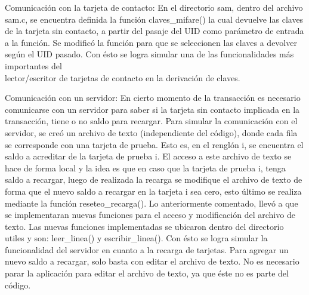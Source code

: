 \bigskip
{}

\bigskip
Comunicación con la tarjeta de contacto: En el directorio sam, dentro del archivo sam.c, se encuentra definida la función claves\_mifare() la cual devuelve las claves de la tarjeta sin contacto, a partir del pasaje del UID como parámetro de entrada a la función. Se modificó la función para que se seleccionen las claves a devolver según el UID pasado. Con ésto se logra simular una de las funcionalidades más importantes del \\
lector/escritor de tarjetas de contacto en la derivación de claves.

\bigskip
Comunicación con un servidor: En cierto momento de la transacción es necesario comunicarse con un servidor para saber si la tarjeta sin contacto implicada en la transacción, tiene o no saldo para recargar. Para simular la comunicación con el servidor, se creó un archivo de texto (independiente del código), donde cada fila se corresponde con una tarjeta de prueba. Esto es, en el renglón i, se encuentra el saldo a acreditar de la tarjeta de prueba i. El acceso a este archivo de texto se hace de forma local y la idea es que en caso que la tarjeta de prueba i, tenga saldo a recargar, luego de realizada la recarga se modifique el archivo de texto de forma que el nuevo saldo a recargar en la tarjeta i sea cero, esto último se realiza mediante la función reseteo\_recarga(). Lo anteriormente comentado, llevó a que se implementaran nuevas funciones para el acceso y modificación del archivo de texto. Las nuevas funciones implementadas se ubicaron dentro del directorio utiles y son: leer\_linea() y escribir\_linea(). Con ésto se logra simular la funcionalidad del servidor en cuanto a la recarga de tarjetas. Para agregar un nuevo saldo a recargar, solo basta con editar el archivo de texto. No es necesario parar la aplicación para editar el archivo de texto, ya que éste no es parte del código.
